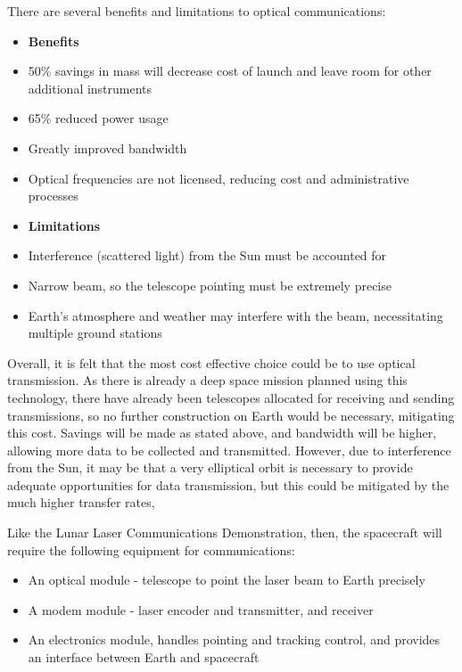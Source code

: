 \documentclass[12pt]{article}
\begin{document}
There are several benefits and limitations to optical communications: 

\begin{itemize}
    \item []\textbf{Benefits}
    \item 50\% savings in mass will decrease cost of launch and leave room for other additional instruments \cite{opticalbenefits}
    \item 65\% reduced power usage \cite{opticalbenefits}
    \item Greatly improved bandwidth 
    \item Optical frequencies are not licensed, reducing cost and administrative processes
\end{itemize}


\begin{itemize}
    \item []\textbf{Limitations}
    \item Interference (scattered light) from the Sun must be accounted for \cite{opticalinterference}
    \item Narrow beam, so the telescope pointing must be extremely precise 
    \item Earth's atmosphere and weather may interfere with the beam, necessitating multiple ground stations
\end{itemize}

Overall, it is felt that the most cost effective choice could be to use optical transmission. As there is already a deep space mission planned using this technology, there have already been telescopes allocated for receiving and sending transmissions, so no further construction on Earth would be necessary, mitigating this cost. Savings will be made as stated above, and bandwidth will be higher, allowing more data to be collected and transmitted. However, due to interference from the Sun, it may be that a very elliptical orbit is necessary to provide adequate opportunities for data transmission, but this could be mitigated by the much higher transfer rates,

\vspace{\baselineskip}

Like the Lunar Laser Communications Demonstration, then, the spacecraft will require the following equipment for communications: 

\begin{itemize}
    \item An optical module - telescope to point the laser beam to Earth precisely \cite{llcd}
    \item A modem module - laser encoder and transmitter, and receiver \cite{llcd}
    \item An electronics module, handles pointing and tracking control, and provides an interface between Earth and spacecraft \cite{llcd}
\end{itemize}
\end{document}
